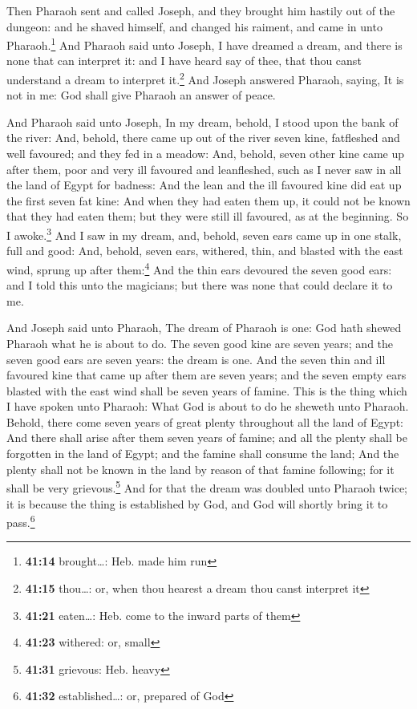  Then Pharaoh sent and called Joseph, and they brought
him hastily out of the dungeon: and he shaved himself, and changed his
raiment, and came in unto Pharaoh.\footnote{\textbf{41:14}
  brought\ldots: Heb. made him run}  And Pharaoh said
unto Joseph, I have dreamed a dream, and there is none that can
interpret it: and I have heard say of thee, that thou canst understand a
dream to interpret it.\footnote{\textbf{41:15} thou\ldots: or, when thou
  hearest a dream thou canst interpret it}  And Joseph
answered Pharaoh, saying, It is not in me: God shall give Pharaoh an
answer of peace.

 And Pharaoh said unto Joseph, In my dream, behold, I
stood upon the bank of the river:  And, behold, there
came up out of the river seven kine, fatfleshed and well favoured; and
they fed in a meadow:  And, behold, seven other kine came
up after them, poor and very ill favoured and leanfleshed, such as I
never saw in all the land of Egypt for badness:  And the
lean and the ill favoured kine did eat up the first seven fat kine:
 And when they had eaten them up, it could not be known
that they had eaten them; but they were still ill favoured, as at the
beginning. So I awoke.\footnote{\textbf{41:21} eaten\ldots: Heb. come to
  the inward parts of them}  And I saw in my dream, and,
behold, seven ears came up in one stalk, full and good: 
And, behold, seven ears, withered, thin, and blasted with the east wind,
sprung up after them:\footnote{\textbf{41:23} withered: or, small}
 And the thin ears devoured the seven good ears: and I
told this unto the magicians; but there was none that could declare it
to me.

 And Joseph said unto Pharaoh, The dream of Pharaoh is
one: God hath shewed Pharaoh what he is about to do.  The
seven good kine are seven years; and the seven good ears are seven
years: the dream is one.  And the seven thin and ill
favoured kine that came up after them are seven years; and the seven
empty ears blasted with the east wind shall be seven years of famine.
 This is the thing which I have spoken unto Pharaoh: What
God is about to do he sheweth unto Pharaoh.  Behold,
there come seven years of great plenty throughout all the land of Egypt:
 And there shall arise after them seven years of famine;
and all the plenty shall be forgotten in the land of Egypt; and the
famine shall consume the land;  And the plenty shall not
be known in the land by reason of that famine following; for it shall be
very grievous.\footnote{\textbf{41:31} grievous: Heb. heavy}
 And for that the dream was doubled unto Pharaoh twice;
it is because the thing is established by God, and God will shortly
bring it to pass.\footnote{\textbf{41:32} established\ldots: or,
  prepared of God}

